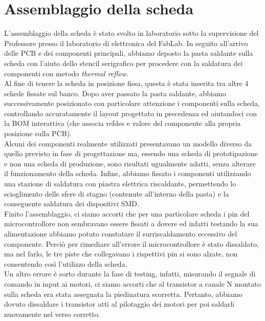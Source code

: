 \chapter{Assemblaggio della scheda}

L’assemblaggio della scheda è stato svolto in laboratorio sotto la supervisione
del Professore presso il laboratorio di elettronica del FabLab. 
In seguito all’arrivo delle PCB e dei componenti principali, abbiamo 
deposto la pasta saldante sulla scheda con l’aiuto dello stencil serigrafico
per procedere con la saldatura dei componenti con metodo \emph{thermal reflow}.\\
Al fine di tenere la scheda in posizione fissa, questa è stata inserita 
tra altre 4 schede fissate sul banco. Dopo aver passato la pasta saldante, 
abbiamo successivamente posizionato con particolare attenzione i componenti 
sulla scheda, controllando accuratamente il layout progettato in precedenza
ed aiutandoci con la BOM interattiva (che associa refdes e valore del componente
alla propria posizione sulla PCB).\\
Alcuni dei componenti realmente utilizzati
presentavano un modello diverso da quello previsto in fase di progettazione ma,
essendo una scheda di prototipazione e non una scheda di produzione, sono
risultati ugualmente adatti, senza alterare il funzionamento della scheda.
Infine, abbiamo fissato i componenti utilizzando una stazione di saldatura 
con piastra elettrica riscaldante, permettendo lo scioglimento delle sfere 
di stagno (contenute all’interno della pasta) e la conseguente saldatura 
dei dispositivi SMD.\\
Finito l’assemblaggio, ci siamo accorti che per una 
particolare scheda i pin del microcontrollore non sembravano essere fissati a
dovere ed infatti testando la sua alimentazione abbiamo potuto constatare il
surriscaldamento eccessivo del componente. Perciò per rimediare all’errore il
microcontrollore è stato dissaldato, ma nel farlo, le tre piste che collegavano
i rispettivi pin si sono alzate, non consentendo così l’utilizzo della scheda.\\
Un altro errore è sorto durante la fase di testing, infatti, misurando il 
segnale di comando in input ai motori, ci siamo accorti che al transistor a 
canale N montato sulla scheda era stata assegnata la piedinatura scorretta. 
Pertanto, abbiamo dovuto dissaldare i transistor atti al pilotaggio dei motori
per poi saldarli nuovamente nel verso corretto.



